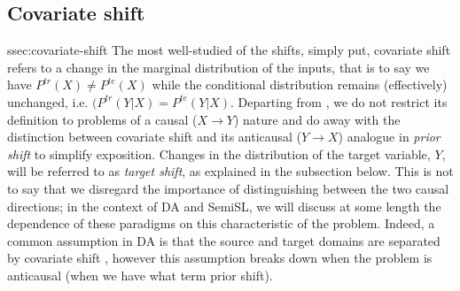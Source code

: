 \subsection{Covariate shift}{ssec:covariate-shift}\label{ssec:covariate-shift}
The most well-studied of the shifts, simply put, covariate shift refers to a change in the marginal
distribution of the inputs, that is to say we have \( P^{tr}(X) \neq P^{te}(X) \) while the
conditional distribution remains (effectively) unchanged, i.e. \( (P^{tr}(Y|X) = P^{te}(Y|X) \).
%
Departing from \cite{moreno2012unifying}, we do not restrict its definition to problems of a causal
(\( X \to Y\)) nature and do away with the distinction between covariate shift and its anticausal
(\( Y \to X \)) analogue in \emph{prior shift} to simplify exposition.
%
Changes in the distribution of the target variable, \(Y\), will be referred to as \emph{target
shift}, as explained in the subsection below.
%
This is not to say that we disregard the importance of distinguishing between the two causal
directions; in the context of DA and SemiSL, we will discuss at some length the dependence of these
paradigms on this characteristic of the problem.
%
Indeed, a common assumption in DA is that the source and target domains are separated by covariate
shift \cite{david2010impossibility}, however this assumption breaks down when the problem is
anticausal (when we have what \cite{moreno2012unifying} term prior shift).

